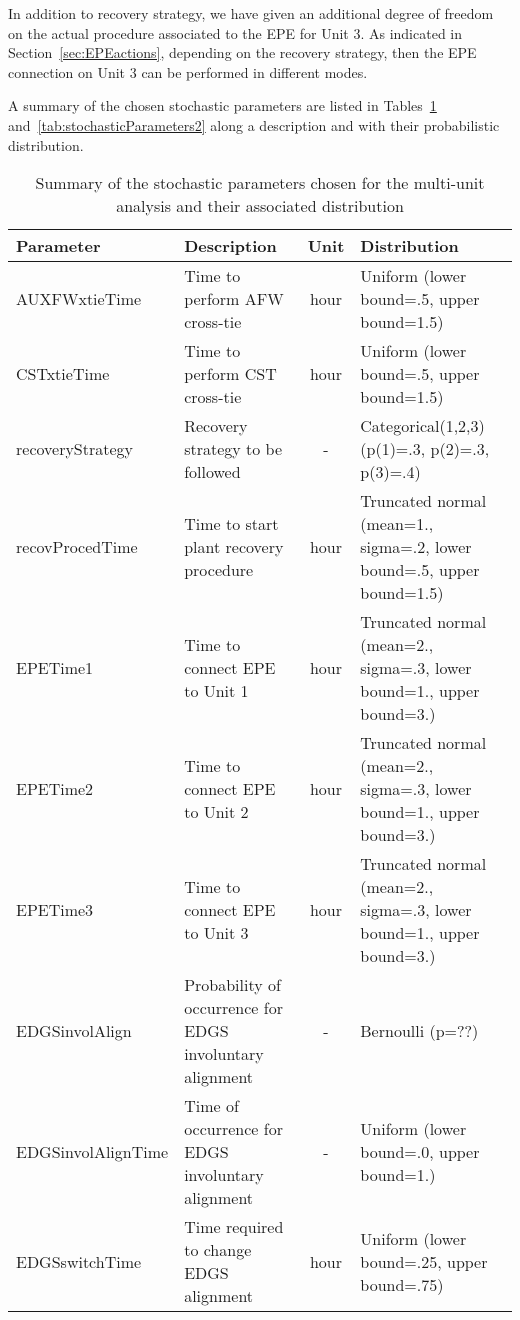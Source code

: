 In addition to recovery strategy, we have given an additional degree of freedom on 
the actual procedure associated to the EPE for Unit 3. 
As indicated in Section~\ref{sec:EPEactions}, depending on the  recovery strategy, 
then the EPE connection on Unit 3 can be performed in different modes. 

A summary of the chosen stochastic parameters are listed in Tables~\ref{tab:stochasticParameters1} 
and~\ref{tab:stochasticParameters2}
along a description and with their probabilistic distribution.

\begin{table}
  \centering
  \begin{center}
      \begin{tabular}{ | l | p{5cm} | c | p{5cm} |}
        \hline
         Parameter          & Description                      & Unit   & Distribution                                         \\ \hline \hline
         AUXFWxtieTime      & Time to perform AFW cross-tie    & hour   & Uniform (lower bound=.5, upper bound=1.5)            \\ \hline
         CSTxtieTime        & Time to perform CST cross-tie    & hour   & Uniform (lower bound=.5, upper bound=1.5)            \\ \hline
         recoveryStrategy   & Recovery strategy to be followed & -      & Categorical(1,2,3) (p(1)=.3, p(2)=.3, p(3)=.4)       \\ \hline
         recovProcedTime    & Time to start plant recovery procedure    & hour        & Truncated normal (mean=1., sigma=.2, lower bound=.5, upper bound=1.5)       \\ \hline
         EPETime1           & Time to connect EPE to Unit 1    & hour   & Truncated normal (mean=2., sigma=.3, lower bound=1., upper bound=3.)   \\ \hline
         EPETime2           & Time to connect EPE to Unit 2    & hour   & Truncated normal (mean=2., sigma=.3, lower bound=1., upper bound=3.)   \\ \hline
         EPETime3           & Time to connect EPE to Unit 3    & hour   & Truncated normal (mean=2., sigma=.3, lower bound=1., upper bound=3.)   \\ \hline
         EDGSinvolAlign     & Probability of occurrence for EDGS involuntary alignment & -      & Bernoulli (p=??)                               \\ \hline
         EDGSinvolAlignTime & Time of occurrence for EDGS involuntary alignment        & -      & Uniform (lower bound=.0, upper bound=1.)       \\ \hline
         EDGSswitchTime     & Time required to change EDGS alignment       & hour  & Uniform (lower bound=.25, upper bound=.75)                  \\ 
        \hline
      \end{tabular}
  \end{center}
  \caption{Summary of the stochastic parameters chosen for the multi-unit analysis and their associated distribution}
  \label{tab:stochasticParameters1}
\end{table}


